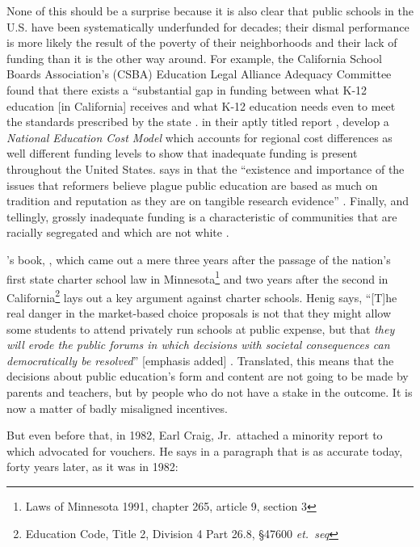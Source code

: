 None of this should be a surprise because it is also clear that public schools in the U.S. have been systematically underfunded for decades; their dismal performance is more likely the result of the poverty of their neighborhoods and their lack of funding than it is the other way around. For example, the California School Boards Association's (CSBA) Education Legal Alliance Adequacy Committee found that there exists a ``substantial gap in funding between what K-12 education [in California] receives and what K-12 education needs even to meet the standards prescribed by the state \parencite[\textit{iii}]{Bray2015}. \textcite{Baker.etal2018} in their aptly titled report , develop a \textit{National Education Cost Model} \parencite%
{Baker.etal2018} which accounts for regional cost differences as well different funding levels to show that inadequate funding is present throughout the United States. \textcite{Garcia2018} says in  that the ``existence and importance of the issues that reformers believe plague public education are based as much on tradition and reputation as they are on tangible research evidence'' \parencite[54]{Garcia2018}. Finally, and tellingly, grossly inadequate funding is a characteristic of communities that are racially segregated and which are not white \parencite{Darling-Hammond2012, Rothstein2017}.

\textcite{Henig1994}'s book, , which came out a mere three years after the passage of the nation's first state charter school law in Minnesota\footnote{Laws of Minnesota 1991, chapter 265, article 9, section 3} and two years after the second in California\footnote{Education Code, Title 2, Division 4 Part 26.8, §47600 \textit{et.\ seq}} lays out a key argument against charter schools. Henig says, ``[T]he real danger in the market-based choice proposals is not that they might allow some students to attend privately run schools at public expense, but that \emph{they will erode the public forums in which decisions with societal consequences can democratically be resolved}'' [emphasis added] \parencite[\emph{xiii}]{Henig1994}. Translated, this means that the decisions about public education's form and content are not going to be made by parents and teachers, but by people who do not have a stake in the outcome. It is now a matter of badly misaligned incentives. %

But even before that, in 1982, Earl Craig, Jr.\ attached a minority report to  which advocated for vouchers. He says in a paragraph that is as accurate today, forty years later, as it was in 1982: 

